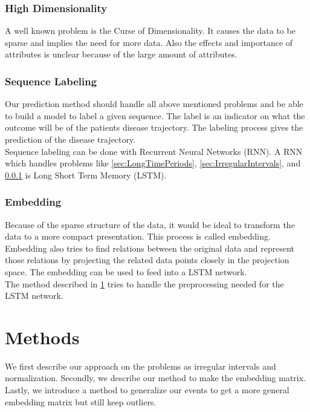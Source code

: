 \documentclass[journal]{IEEETemplate/IEEEtran}
\begin{document}
\subsubsection{High Dimensionality}
\label{sec:HighDimensionality}
A well known problem is the Curse of Dimensionality\cite{11}. It causes the data to be sparse and implies the need for more data. Also the effects and importance of attributes is unclear because of the large amount of attributes. \\
\subsubsection{Sequence Labeling}
Our prediction method should handle all above mentioned problems and be able to build a model to label a given sequence. The label is an indicator on what the outcome will be of the patients disease trajectory. The labeling process gives the prediction of the disease trajectory. \\
Sequence labeling can be done with Recurrent Neural Networks (RNN). A RNN which handles problems like \ref{sec:LongTimePeriods}, \ref{sec:IrregularIntervals}, and \ref{sec:HighDimensionality} is Long Short Term Memory (LSTM)\cite{12}. \\
\subsubsection{Embedding} 
Because of the sparse structure of the data, it would be ideal to transform the data to a more compact presentation. This process is called embedding\cite{13a}. Embedding also tries to find relations between the original data and represent those relations by projecting the related data points closely in the projection space. The embedding can be used to feed into a LSTM network. \\

The method described in \ref{sec:Methods} tries to handle the preprocessing needed for the LSTM network.

\section{Methods}
\label{sec:Methods}
We first describe our approach on the problems as irregular intervals and normalization. Secondly, we describe our method to make the embedding matrix. Lastly, we introduce a method to generalize our events to get a more general embedding matrix but still keep outliers.
\end{document}
